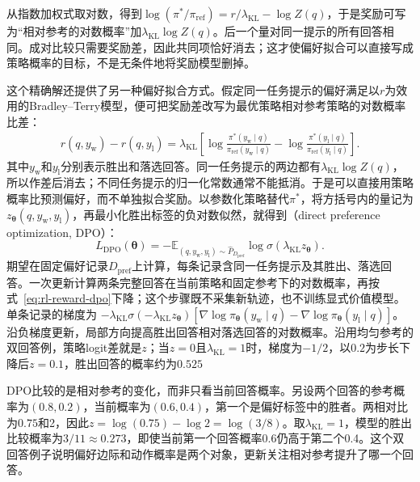 从指数加权式取对数，得到$\log(\pi^*/\pi_{\mathrm{ref}})=r/\lambda_{\mathrm{KL}}-\log Z(q)$，于是奖励可写为“相对参考的对数概率”加$\lambda_{\mathrm{KL}}\log Z(q)$。后一个量对同一提示的所有回答相同。成对比较只需要奖励差，因此共同项恰好消去；这才使偏好拟合可以直接写成策略概率的目标，不是无条件地将奖励模型删掉。

这个精确解还提供了另一种偏好拟合方式。假定同一任务提示的偏好满足以$r$为效用的Bradley--Terry模型，便可把奖励差改写为最优策略相对参考策略的对数概率比差：
\begin{equation}
  \begin{aligned}
    r(q,y_{\mathrm w})-r(q,y_{\mathrm l})
    =\lambda_{\mathrm{KL}}\left[
      \log\frac{\pi^*(y_{\mathrm w}\mid q)}
                    {\pi_{\mathrm{ref}}(y_{\mathrm w}\mid q)}
      -\log\frac{\pi^*(y_{\mathrm l}\mid q)}
                    {\pi_{\mathrm{ref}}(y_{\mathrm l}\mid q)}
    \right].
  \end{aligned}
  \label{eq:rl-reward-dpo-change}
\end{equation}
其中$y_{\mathrm w}$和$y_{\mathrm l}$分别表示胜出和落选回答。同一任务提示的两边都有$\lambda_{\mathrm{KL}}\log Z(q)$，所以作差后消去；不同任务提示的归一化常数通常不能抵消。于是可以直接用策略概率比预测偏好，而不单独拟合奖励。以参数化策略替代$\pi^*$，将方括号内的量记为$z_{\bm{\theta}}(q,y_{\mathrm w},y_{\mathrm l})$，再最小化胜出标签的负对数似然，就得到（direct preference optimization, DPO）：
\begin{equation}
  L_{\mathrm{DPO}}(\bm{\theta})
  =-\mathbb E_{(q,y_{\mathrm w},y_{\mathrm l})\sim\widehat P_{D_{\mathrm{pref}}}}
         \log\sigma\!\left(\lambda_{\mathrm{KL}} z_{\bm{\theta}}\right).
  \label{eq:rl-reward-dpo}
\end{equation}
期望在固定偏好记录$D_{\mathrm{pref}}$上计算，每条记录含同一任务提示及其胜出、落选回答。一次更新计算两条完整回答在当前策略和固定参考下的对数概率，再按式~\eqref{eq:rl-reward-dpo}下降；这个步骤既不采集新轨迹，也不训练显式价值模型。单条记录的梯度为
$-\lambda_{\mathrm{KL}}\sigma(-\lambda_{\mathrm{KL}} z_{\bm{\theta}})
[\nabla\log\pi_{\bm{\theta}}(y_{\mathrm w}\mid q)
-\nabla\log\pi_{\bm{\theta}}(y_{\mathrm l}\mid q)]$。
沿负梯度更新，局部方向提高胜出回答相对落选回答的对数概率。沿用均匀参考的双回答例，策略logit差就是$z$；当$z=0$且$\lambda_{\mathrm{KL}}=1$时，梯度为$-1/2$，以$0.2$为步长下降后$z=0.1$，胜出回答的概率约为$0.525$

DPO比较的是相对参考的变化，而非只看当前回答概率。另设两个回答的参考概率为$(0.8,0.2)$，当前概率为$(0.6,0.4)$，第一个是偏好标签中的胜者。两相对比为$0.75$和2，因此$z=\log(0.75)-\log2=\log(3/8)$。取$\lambda_{\mathrm{KL}}=1$，模型的胜出比较概率为$3/11\approx0.273$，即使当前第一个回答概率0.6仍高于第二个0.4。这个双回答例子说明偏好边际和动作概率是两个对象，更新关注相对参考提升了哪一个回答。


